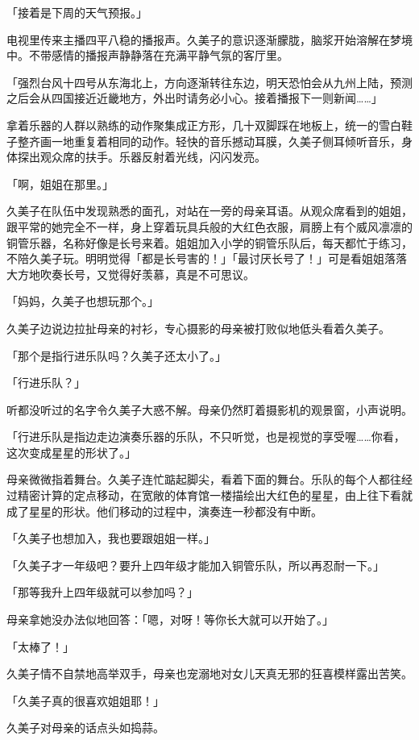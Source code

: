 \documentclass[UTF8]{ctexart}
\begin{document}
    「接着是下周的天气预报。」 

    电视里传来主播四平八稳的播报声。久美子的意识逐渐朦胧，脑浆开始溶解在梦境中。不带感情的播报声静静落在充满平静气氛的客厅里。 

    「强烈台风十四号从东海北上，方向逐渐转往东边，明天恐怕会从九州上陆，预测之后会从四国接近近畿地方，外出时请务必小心。接着播报下一则新闻……」 

    拿着乐器的人群以熟练的动作聚集成正方形，几十双脚踩在地板上，统一的雪白鞋子整齐画一地重复着相同的动作。轻快的音乐撼动耳膜，久美子侧耳倾听音乐，身体探出观众席的扶手。乐器反射着光线，闪闪发亮。 

    「啊，姐姐在那里。」 

    久美子在队伍中发现熟悉的面孔，对站在一旁的母亲耳语。从观众席看到的姐姐，跟平常的她完全不一样，身上穿着玩具兵般的大红色衣服，肩膀上有个威风凛凛的铜管乐器，名称好像是长号来着。姐姐加入小学的铜管乐队后，每天都忙于练习，不陪久美子玩。明明觉得「都是长号害的！」「最讨厌长号了！」可是看姐姐落落大方地吹奏长号，又觉得好羡慕，真是不可思议。 

    「妈妈，久美子也想玩那个。」 

    久美子边说边拉扯母亲的衬衫，专心摄影的母亲被打败似地低头看着久美子。 

    「那个是指行进乐队吗？久美子还太小了。」 

    「行进乐队？」 

    听都没听过的名字令久美子大惑不解。母亲仍然盯着摄影机的观景窗，小声说明。 

    「行进乐队是指边走边演奏乐器的乐队，不只听觉，也是视觉的享受喔……你看，这次变成星星的形状了。」 

    母亲微微指着舞台。久美子连忙踮起脚尖，看着下面的舞台。乐队的每个人都往经过精密计算的定点移动，在宽敞的体育馆一楼描绘出大红色的星星，由上往下看就成了星星的形状。他们移动的过程中，演奏连一秒都没有中断。 

    「久美子也想加入，我也要跟姐姐一样。」 

    「久美子才一年级吧？要升上四年级才能加入铜管乐队，所以再忍耐一下。」 

    「那等我升上四年级就可以参加吗？」 

    母亲拿她没办法似地回答：「嗯，对呀！等你长大就可以开始了。」 

    「太棒了！」 

    久美子情不自禁地高举双手，母亲也宠溺地对女儿天真无邪的狂喜模样露出苦笑。 

    「久美子真的很喜欢姐姐耶！」 

    久美子对母亲的话点头如捣蒜。 
\end{document}
